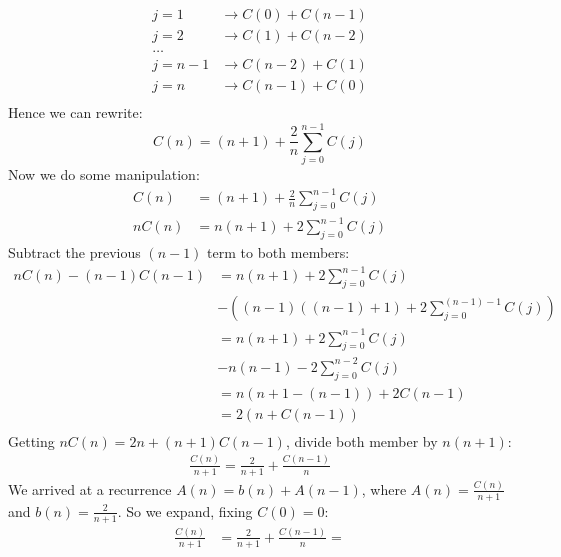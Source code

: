 \begin{description}
\begin{displaymath}
\begin{split}
      j=1 &\rightarrow C(0) + C(n-1) \\
      j=2 &\rightarrow C(1) + C(n-2) \\
      \ldots& \\
      j=n-1 &\rightarrow C(n-2) + C(1) \\
      j=n &\rightarrow C(n-1) + C(0) \\
    \end{split}
  \end{displaymath}
  Hence we can rewrite:
  \begin{displaymath}
    C(n) = (n+1) +  \frac{2}{n}\sum_{j=0}^{n-1}{C(j)} 
  \end{displaymath}
  Now we do some manipulation:
  \begin{displaymath}
    \begin{split}
      C(n) &= (n+1) + \frac{2}{n}\sum_{j=0}^{n-1}{C(j)}\\
      nC(n) &= n(n+1) + 2\sum_{j=0}^{n-1}{C(j)}
    \end{split}
  \end{displaymath}
  Subtract the previous $(n-1)$ term to both members:
  \begin{displaymath}
    \begin{split}
      nC(n) -(n-1)C(n-1) &= n(n+1) + 2\sum_{j=0}^{n-1}{C(j)} \\
      &-\left((n-1)((n-1)+1) + 2\sum_{j=0}^{(n-1)-1}{C(j)}\right) \\
      &= n(n+1) + 2\sum_{j=0}^{n-1}{C(j)} \\
      &-n(n-1) - 2\sum_{j=0}^{n-2}{C(j)} \\
      &= n(n+1-(n-1)) + 2C(n-1) \\
      &= 2(n + C(n-1)) \\      
    \end{split}
  \end{displaymath}
  Getting $nC(n) = 2n + (n+1)C(n-1)$, divide both member by $n(n+1)$:
  \begin{displaymath}
    \begin{split}
      \frac{C(n)}{n+1}  = \frac{2}{n+1} +
      \frac{C(n-1)}{n}
    \end{split}
  \end{displaymath}
  We arrived at a recurrence $A(n) = b(n) + A(n-1)$, where $A(n) =
  \frac{C(n)}{n+1} $ and $b(n) = \frac{2}{n+1} $. So we expand, fixing
  $C(0) = 0$:
  \begin{displaymath}
    \begin{split}
      \frac{C(n)}{n+1} &= \frac{2}{n+1} + \frac{C(n-1)}{n} =

\end{split}
\end{displaymath}
\end{description}
